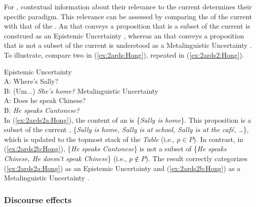\documentclass[output=paper,colorlinks,citecolor=brown]{langscibook}
\begin{document}
For , contextual information about their relevance to the current  determines their specific paradigm. This relevance can be assessed by comparing the  of the current  with that of the . An  that conveys a proposition that is a subset of the current  is construed as an Epistemic Uncertainty , whereas an  that conveys a proposition that is not a subset of the current  is understood as a Metalinguistic Uncertainty . To illustrate, compare two  in (\ref{ex:2ards:Hong}), repeated in (\ref{ex:2ards2:Hong}).

\ea \label{ex:2ards2:Hong}
    \ea \label{ex:2ards2a:Hong} Epistemic Uncertainty \\
    A: Where's Sally?\\
    B: (Um...) \textit{She's home?}
    \ex \label{ex:2ards2b:Hong} Metalinguistic Uncertainty \\
    A: Does he speak Chinese?\\
    B: \textit{He speaks Cantonese?}\\
    \z
\z
In (\ref{ex:2ards2a:Hong}), the content of an  is \{\textit{Sally is home}\}. This proposition is a subset of the current , \{\textit{Sally is home, Sally is at school, Sally is at the café, …}\}, which is updated to the topmost stack of the \textit{Table} (i.e., $p \in P$). In contrast, in (\ref{ex:2ards2b:Hong}), \{\textit{He speaks Cantonese}\} is not a subset of \{\textit{He speaks Chinese, He doesn’t speak Chinese}\} (i.e., $p \notin P$).  The result correctly categorizes (\ref{ex:2ards2a:Hong}) as an Epistemic Uncertainty  and (\ref{ex:2ards2b:Hong}) as a Metalinguistic Uncertainty .

\subsubsection{Discourse effects}
\label{sec:ardde:Hong}
\end{document}
